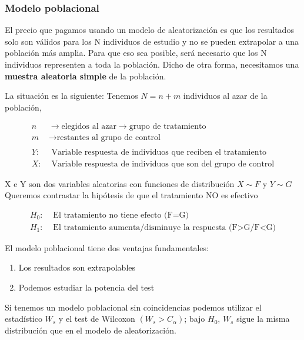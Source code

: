 \subsubsection{Modelo poblacional}

El precio que pagamos usando un modelo de aleatorización es que los resultados solo son válidos para los N individuos de estudio y no se pueden extrapolar a una población más amplia.
Para que eso sea posible, será necesario que los N individuos representen a toda la población. Dicho de otra forma, necesitamos una \textbf{muestra aleatoria simple} de la población.

La situación es la siguiente:
Tenemos $N=n+m$ individuos al azar de la población,

$$
\begin{aligned}
    n & \longrightarrow \text{elegidos al azar}\longrightarrow \text{grupo de tratamiento} \\
    m & \longrightarrow \text{restantes al grupo de control} \\
    \ & \ \\
    Y: & \text{ Variable respuesta de individuos que reciben el tratamiento}\\
    X: & \text{ Variable respuesta de individuos que son del grupo de control}  
\end{aligned}
$$

X e Y son dos variables aleatorias con funciones de distribución $X\sim F$ y $Y\sim G$ \\
\noindent Queremos contrastar la hipótesis de que el tratamiento NO es efectivo

$$
\begin{aligned}
    H_0: & \text{ El tratamiento no tiene efecto (F=G)} \\
    H_1: & \text{ El tratamiento aumenta/disminuye la respuesta (F>G/F<G)}  
\end{aligned}
$$

El modelo poblacional tiene dos ventajas fundamentales:
\begin{enumerate}
    \item Los resultados son extrapolables
    \item Podemos estudiar la potencia del test
\end{enumerate}

\noindent Si tenemos un modelo poblacional sin coincidencias podemos utilizar el estadístico $W_s$ y el test de Wilcoxon $(W_s>C_\alpha)$; bajo $H_0$, $W_s$ sigue la misma distribución que en el modelo de aleatorización.

